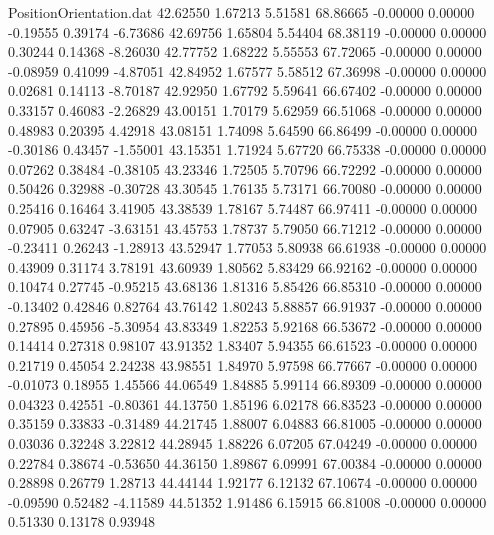 \begin{filecontents}{PositionOrientation.dat}
  42.62550    1.67213    5.51581    68.86665   -0.00000    0.00000   -0.19555    0.39174   -6.73686
  42.69756    1.65804    5.54404    68.38119   -0.00000    0.00000    0.30244    0.14368   -8.26030
  42.77752    1.68222    5.55553    67.72065   -0.00000    0.00000   -0.08959    0.41099   -4.87051
  42.84952    1.67577    5.58512    67.36998   -0.00000    0.00000    0.02681    0.14113   -8.70187
  42.92950    1.67792    5.59641    66.67402   -0.00000    0.00000    0.33157    0.46083   -2.26829
  43.00151    1.70179    5.62959    66.51068   -0.00000    0.00000    0.48983    0.20395    4.42918
  43.08151    1.74098    5.64590    66.86499   -0.00000    0.00000   -0.30186    0.43457   -1.55001
  43.15351    1.71924    5.67720    66.75338   -0.00000    0.00000    0.07262    0.38484   -0.38105
  43.23346    1.72505    5.70796    66.72292   -0.00000    0.00000    0.50426    0.32988   -0.30728
  43.30545    1.76135    5.73171    66.70080   -0.00000    0.00000    0.25416    0.16464    3.41905
  43.38539    1.78167    5.74487    66.97411   -0.00000    0.00000    0.07905    0.63247   -3.63151
  43.45753    1.78737    5.79050    66.71212   -0.00000    0.00000   -0.23411    0.26243   -1.28913
  43.52947    1.77053    5.80938    66.61938   -0.00000    0.00000    0.43909    0.31174    3.78191
  43.60939    1.80562    5.83429    66.92162   -0.00000    0.00000    0.10474    0.27745   -0.95215
  43.68136    1.81316    5.85426    66.85310   -0.00000    0.00000   -0.13402    0.42846    0.82764
  43.76142    1.80243    5.88857    66.91937   -0.00000    0.00000    0.27895    0.45956   -5.30954
  43.83349    1.82253    5.92168    66.53672   -0.00000    0.00000    0.14414    0.27318    0.98107
  43.91352    1.83407    5.94355    66.61523   -0.00000    0.00000    0.21719    0.45054    2.24238
  43.98551    1.84970    5.97598    66.77667   -0.00000    0.00000   -0.01073    0.18955    1.45566
  44.06549    1.84885    5.99114    66.89309   -0.00000    0.00000    0.04323    0.42551   -0.80361
  44.13750    1.85196    6.02178    66.83523   -0.00000    0.00000    0.35159    0.33833   -0.31489
  44.21745    1.88007    6.04883    66.81005   -0.00000    0.00000    0.03036    0.32248    3.22812
  44.28945    1.88226    6.07205    67.04249   -0.00000    0.00000    0.22784    0.38674   -0.53650
  44.36150    1.89867    6.09991    67.00384   -0.00000    0.00000    0.28898    0.26779    1.28713
  44.44144    1.92177    6.12132    67.10674   -0.00000    0.00000   -0.09590    0.52482   -4.11589
  44.51352    1.91486    6.15915    66.81008   -0.00000    0.00000    0.51330    0.13178    0.93948

\end{filecontents}
